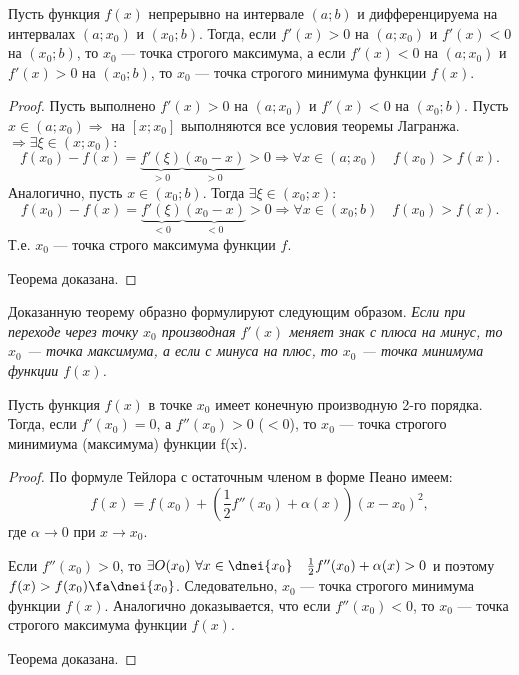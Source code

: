 \begin{thm} Пусть функция $f(x)$ непрерывно на интервале $(a;b)$ и дифференцируема на интервалах $(a;x_0)$ и $(x_0;b)$. Тогда, если $f'(x) > 0$ на $(a;x_0)$ и $f'(x) < 0$ на $(x_0;b)$, то $x_0$ --- точка строгого максимума, а если $f'(x) < 0$ на $(a;x_0)$ и $f'(x) > 0$ на $(x_0;b)$, то $x_0$ --- точка строгого минимума функции $f(x)$.
\end{thm}
\begin{proof}
Пусть выполнено $f'(x) > 0$ на $(a;x_0)$ и $f'(x) < 0$ на $(x_0;b)$. Пусть $x \in (a;x_0) \Rightarrow$ на $[x;x_0]$ выполняются все условия теоремы Лагранжа. $\Rightarrow \exists \xi \in (x;x_0):$ 
$$
f(x_0)-f(x) = \underbrace{f'(\xi)}_{>0} \underbrace{(x_0-x)}_{>0} >0 \Rightarrow \forall x \in (a;x_0)\quad f(x_0) > f(x).
$$
Аналогично, пусть $x\in(x_0;b)$. Тогда $\exists \xi \in (x_0;x):$
$$
f(x_0)-f(x) = \underbrace{f'(\xi)}_{<0} \underbrace{(x_0-x)}_{<0} >0 \Rightarrow \forall x \in (x_0;b) \quad f(x_0) > f(x).
$$
Т.е. $x_0$ --- точка строго максимума функции $f$.

\noindent
Теорема доказана.
\end{proof}
Доказанную теорему образно формулируют следующим образом. \textit{Если при переходе через точку $x_0$ производная $f'(x)$ меняет знак с плюса на минус, то $x_0$ --- точка максимума, а если с минуса на плюс, то $x_0$ --- точка минимума функции $f(x)$.}
\begin{thm}  Пусть функция $f(x)$ в точке $x_0$ имеет конечную производную 2-го порядка. Тогда, если $f'(x_0) = 0$, а $f''(x_0) > 0$ \textup{($<0$)}, то $x_0$ --- точка строгого минимиума \textup{(}максимума\textup{)} функции f(x).
\end{thm}

\begin{proof}
По формуле Тейлора с остаточным членом в форме Пеано имеем:	
$$
f(x)=f(x_0)+\left(\frac{1}{2}f''(x_0)+\alpha(x)\right)(x-x_0)^2,
$$
где $\alpha \to 0$ при $x \to x_0$.
 
Если $f''(x_0) > 0$, то $\exists O(x_0)\ \forall x\in\dnei{x_0}\quad\frac{1}{2}f''(x_0)+\alpha(x)>0$
и поэтому $f(x) > f(x_0) \fa \dnei{x_0}$. Следовательно, $x_0$ --- точка строгого минимума функции $f(x)$.
Аналогично доказывается, что если $ f''(x_0) < 0$, то $x_0$ — точка строгого максимума функции $f(x)$.

\noindent
Теорема доказана.
\end{proof}


